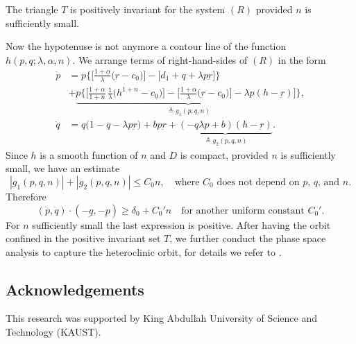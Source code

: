 \documentclass[graybox]{svmult}
\def\dpp{\dot{p}}
\def\dqq{\dot{q}}
\begin{document}
\begin{lemma}
The triangle $T$  is positively invariant for the system $(R)$ provided $n$ is sufficiently small.
\end{lemma}
Now the hypotenuse is not anymore a contour line of the function $h(p,q;\lambda,\alpha,n)$. We arrange terms of right-hand-sides of $(R)$ in the form
\begin{align*}
 {\dpp}&=p\bigg\{\Big[\frac{1+\alpha}{\lambda }\Big(\underbar{r}-c_0\Big)\Big] -\Big[d_1 + q + \lambda p\underbar{r}\Big]\bigg\} \\
 &+ \underbrace{p\bigg\{\Big[\frac{1+\alpha}{1+n}\,\frac{1}{\lambda }\Big(h^{1+n}-c_0\Big)\Big]-\Big[\frac{1+\alpha}{\lambda }\Big(\underbar{r}-c_0\Big)\Big] -\lambda p(h-\underbar{r})\Big]\bigg\}}_\text{$\triangleq g_1(p,q,n)$},\\
 {\dqq}&=q\Big(1-q-\lambda p \underbar{r}\Big) + bp\underbar{r} + \underbrace{(-q\lambda p+b) (h-\underbar{r})}_\text{$\triangleq g_2(p,q,n)$}.
\end{align*}
Since $h$ is a smooth function of $n$ and $D$ is compact, provided $n$ is sufficiently small, we have an estimate
\begin{equation*}
 |g_1(p,q,n)| + |g_2(p,q,n)| \le C_0 n, \quad \text{where $C_0$ does not depend on $p$, $q$, and $n$.}
\end{equation*}
Therefore
$$ (\dot{p},\dot{q}) \cdot(-\underbar{q},-\underbar{p}) \ge \delta_0 + C_0'n \quad \text{for another uniform constant $C_0'$}.$$
For $n$ sufficiently small the last expression is positive. After having the orbit confined in the positive invariant set $T$, we further conduct the phase space analysis to capture the heteroclinic orbit, for details we refer to \cite{LT16, LT16_2}. 
\subsection*{Acknowledgements}
This research was supported by King Abdullah University of Science and Technology (KAUST).
\end{document}
